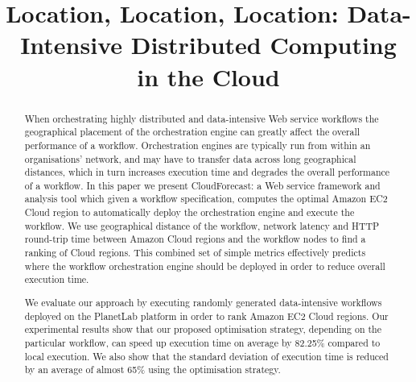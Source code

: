 \documentclass[10pt, conference, compsocconf]{IEEEtran}
\newcommand{\sysname}{CloudForecast\xspace}
\begin{document}
\title{Location, Location, Location: Data-Intensive Distributed Computing in the Cloud}




\author{
}














\maketitle


\begin{abstract}

When orchestrating highly distributed and data-intensive Web service workflows the geographical placement of the orchestration engine can greatly affect the overall performance of a workflow. Orchestration engines are typically run from within an organisations' network, and may have to transfer data across long geographical distances, which in turn increases execution time and degrades the overall performance of a workflow. In this paper we present \sysname: a Web service framework and analysis tool which given a workflow specification, computes the optimal Amazon EC2 Cloud region to automatically deploy the orchestration engine and execute the workflow.  We use geographical distance of the workflow, network latency and HTTP round-trip time between Amazon Cloud regions and the workflow nodes to find a ranking of Cloud regions. This combined set of simple metrics effectively predicts where the workflow orchestration engine should be deployed in order to reduce overall execution time.

We evaluate our approach by executing randomly generated data-intensive workflows deployed on the PlanetLab platform in order to rank Amazon EC2 Cloud regions. Our experimental results show that our proposed optimisation strategy, depending on the particular workflow, can speed up execution time on average by 82.25\% compared to local execution. We also show that the standard deviation of execution time is reduced by an average of almost 65\% using the optimisation strategy.

\end{abstract}
\end{document}
